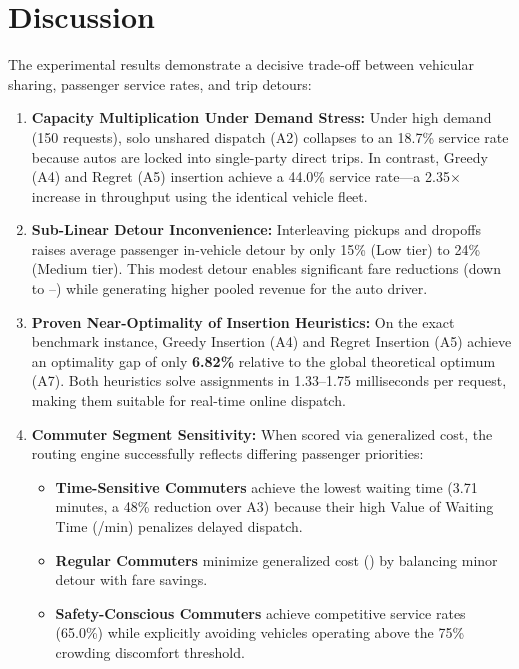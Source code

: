 \section{Discussion}
The experimental results demonstrate a decisive trade-off between vehicular sharing, passenger service rates, and trip detours:
\begin{enumerate}
\item \textbf{Capacity Multiplication Under Demand Stress:} Under high demand (150 requests), solo unshared dispatch (A2) collapses to an 18.7\% service rate because autos are locked into single-party direct trips. In contrast, Greedy (A4) and Regret (A5) insertion achieve a 44.0\% service rate---a 2.35$\times$ increase in throughput using the identical vehicle fleet.
\item \textbf{Sub-Linear Detour Inconvenience:} Interleaving pickups and dropoffs raises average passenger in-vehicle detour by only 15\% (Low tier) to 24\% (Medium tier). This modest detour enables significant fare reductions (down to --) while generating higher pooled revenue for the auto driver.
\item \textbf{Proven Near-Optimality of Insertion Heuristics:} On the exact benchmark instance, Greedy Insertion (A4) and Regret Insertion (A5) achieve an optimality gap of only \textbf{6.82\%} relative to the global theoretical optimum (A7). Both heuristics solve assignments in 1.33--1.75 milliseconds per request, making them suitable for real-time online dispatch.
\item \textbf{Commuter Segment Sensitivity:} When scored via generalized cost, the routing engine successfully reflects differing passenger priorities:
  \begin{itemize}
  \item \textbf{Time-Sensitive Commuters} achieve the lowest waiting time (3.71 minutes, a 48\% reduction over A3) because their high Value of Waiting Time (/min) penalizes delayed dispatch.
  \item \textbf{Regular Commuters} minimize generalized cost () by balancing minor detour with fare savings.
  \item \textbf{Safety-Conscious Commuters} achieve competitive service rates (65.0\%) while explicitly avoiding vehicles operating above the 75\% crowding discomfort threshold.
  \end{itemize}
\end{enumerate}

